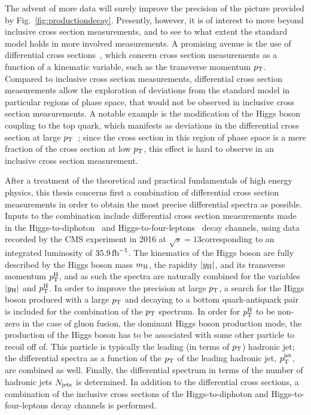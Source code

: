 The advent of more data will surely improve the precision of the picture provided by Fig.~\ref{fig:productiondecay}.
% 
Presently, however, it is of interest to move beyond inclusive cross section measurements, and to see to what extent the standard model holds in more involved measurements.
% 
A promising avenue is the use of differential cross sections~\cite{Aad:2014lwa,Khachatryan:2015rxa,Aad:2014tca,Khachatryan:2015yvw,Aad:2016lvc,Khachatryan:2016vnn,Aaboud:2018xdt,Sirunyan:2018kta,Aaboud:2017oem,Sirunyan:2017exp,Aaboud:2018ezd}, which concern cross section measurements as a function of a kinematic variable, such as the transverse momentum $p_\mathrm{T}$.
% 
Compared to inclusive cross section measurements, differential cross section measurements allow the exploration of deviations from the standard model in particular regions of phase space, that would not be observed in inclusive cross section measurements.
% 
A notable example is the modification of the Higgs boson coupling to the top quark, which manifests as deviations in the differential cross section at large $p_\mathrm{T}$~\cite{Grazzini:2017szg,Grazzini:2016paz}; since the cross section in this region of phase space is a mere fraction of the cross section at low $p_\mathrm{T}$, this effect is hard to observe in an inclusive cross section measurement.


After a treatment of the theoretical and practical fundamentals of high energy physics, this thesis concerns first a combination of differential cross section measurements in order to obtain the most precise differential spectra as possible.
% 
Inputs to the combination include differential cross section measurements made in the Higgs-to-diphoton~\cite{Sirunyan:2018kta} and Higgs-to-four-leptons~\cite{Sirunyan:2017exp} decay channels, using data recorded by the CMS experiment in 2016 at $\sqrt{s}=13$\TeV corresponding to an integrated luminosity of $35.9\,\text{fb}^{-1}$.
% 
The kinematics of the Higgs boson are fully described by the Higgs boson mass $m_{\mathrm{H}}$, the rapidity $\left|y_\mathrm{H}\right| $, and its transverse momentum $p_\mathrm{T}^\mathrm{H}$, and as such the spectra are naturally combined for the variables $\left|y_\mathrm{H}\right| $ and $p_\mathrm{T}^\mathrm{H}$.
% 
In order to improve the precision at large $p_\mathrm{T}$, a search for the Higgs boson produced with a large $p_\mathrm{T}$ and decaying to a bottom quark-antiquark pair~\cite{Sirunyan:2017dgc} is included for the combination of the $p_\mathrm{T}$ spectrum.
% 
% 
In order for $p_\mathrm{T}^\mathrm{H}$ to be non-zero in the case of gluon fusion, the dominant Higgs boson production mode, the production of the Higgs boson has to be associated with some other particle to recoil off of.
% 
This particle is typically the leading (in terms of $p_\mathrm{T}$) hadronic jet; the differential spectra as a function of the $p_\mathrm{T}$ of the leading hadronic jet, $p_\mathrm{T}^\text{jet} $, are combined as well.
% 
Finally, the differential spectrum in terms of the number of hadronic jets $N_\text{jets} $ is determined.
% 
In addition to the differential cross sections, a combination of the inclusive cross sections of the  Higgs-to-diphoton and Higgs-to-four-leptons decay channels is performed.


